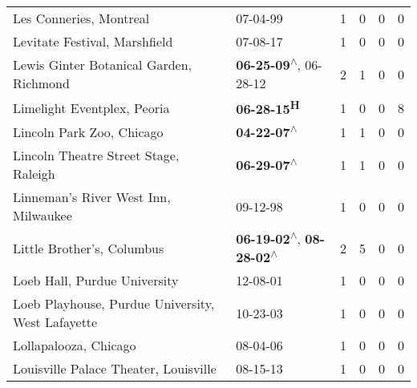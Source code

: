 \begin{supertabular}{p{0.4\textwidth}p{0.3\textwidth}p{0.05\textwidth}p{0.05\textwidth}p{0.05\textwidth}p{0.05\textwidth}}
                                                      Les Conneries, Montreal &                                                                  07-04-99\textsuperscript{} &  1 &  0 &  0 &  0 \\
                                                Levitate Festival, Marshfield &                                                                  07-08-17\textsuperscript{} &  1 &  0 &  0 &  0 \\
                                      Lewis Ginter Botanical Garden, Richmond &                     \textbf{06-25-09\textsuperscript{$\wedge$}}, 06-28-12\textsuperscript{} &  2 &  1 &  0 &  0 \\
                                                  Limelight Eventplex, Peoria &                                                        \textbf{06-28-15\textsuperscript{H}} &  1 &  0 &  0 &  8 \\
                                                    Lincoln Park Zoo, Chicago &                                                 \textbf{04-22-07\textsuperscript{$\wedge$}} &  1 &  1 &  0 &  0 \\
                                        Lincoln Theatre Street Stage, Raleigh &                                                 \textbf{06-29-07\textsuperscript{$\wedge$}} &  1 &  1 &  0 &  0 \\
                                         Linneman's River West Inn, Milwaukee &                                                                  09-12-98\textsuperscript{} &  1 &  0 &  0 &  0 \\
                                                   Little Brother's, Columbus &    \textbf{06-19-02\textsuperscript{$\wedge$}}, \textbf{08-28-02\textsuperscript{$\wedge$}} &  2 &  5 &  0 &  0 \\
                                                 Loeb Hall, Purdue University &                                                                  12-08-01\textsuperscript{} &  1 &  0 &  0 &  0 \\
                            Loeb Playhouse, Purdue University, West Lafayette &                                                                  10-23-03\textsuperscript{} &  1 &  0 &  0 &  0 \\
                                                        Lollapalooza, Chicago &                                                                  08-04-06\textsuperscript{} &  1 &  0 &  0 &  0 \\
                                        Louisville Palace Theater, Louisville &                                                                  08-15-13\textsuperscript{} &  1 &  0 &  0 &  0 \\

\end{supertabular}
